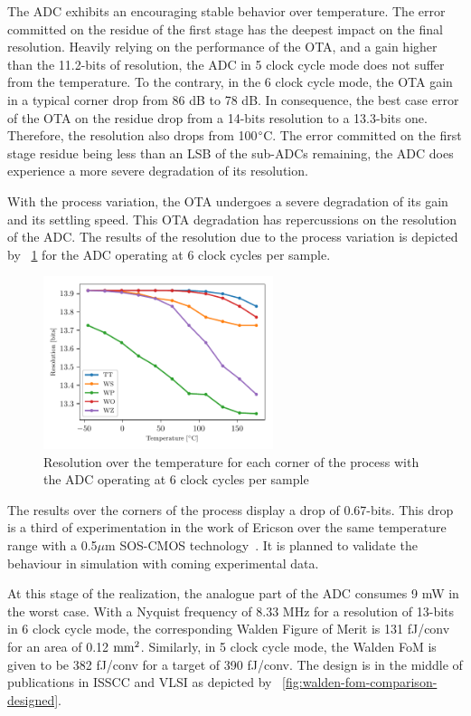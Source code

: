 The ADC exhibits an encouraging stable behavior over temperature. The error committed on the residue of the first stage has the deepest impact on the final resolution. Heavily relying on the performance of the OTA, and a gain higher than the 11.2-bits of resolution, the ADC in 5 clock cycle mode does not suffer from the temperature. To the contrary, in the 6 clock cycle mode, the OTA gain in a typical corner drop from 86 dB to 78 dB. In consequence, the best case error of the OTA on the residue drop from a 14-bits resolution to a 13.3-bits one. Therefore, the resolution also drops from 100$\degree$C. The error committed on the first stage residue being less than an LSB of the sub-ADCs remaining, the ADC does experience a more severe degradation of its resolution.

With the process variation, the OTA undergoes a severe degradation of its gain and its settling speed. This OTA degradation has repercussions on the resolution of the ADC. The results of the resolution due to the process variation is depicted by \figurename~\ref{fig:adc-res-schematic-temp-corners} for the ADC operating at 6 clock cycles per sample.

\begin{figure}[htp]
    \centering
    \includegraphics[width=0.6\textwidth]{Chapter5/Figs/preliminary/adc_real_ota_osr6_temp-corners.pdf}
    \caption{Resolution over the temperature for each corner of the process with the ADC operating at 6 clock cycles per sample}
    \label{fig:adc-res-schematic-temp-corners}
\end{figure}

The results over the corners of the process display a drop of 0.67-bits. This drop is a third of experimentation in the work of Ericson over the same temperature range with a 0.5$\mu$m SOS-CMOS technology~\cite{Ericson2004}. It is planned to validate the behaviour in simulation with coming experimental data.

At this stage of the realization, the analogue part of the ADC consumes 9 mW in the worst case. With a Nyquist frequency of 8.33 MHz for a resolution of 13-bits in 6 clock cycle mode, the corresponding Walden Figure of Merit is 131 fJ/conv for an area of 0.12 $\rm mm^2$. Similarly, in 5 clock cycle mode, the Walden FoM is given to be 382 fJ/conv for a target of 390 fJ/conv. The design is in the middle of publications in ISSCC and VLSI as depicted by \figurename~\ref{fig:walden-fom-comparison-designed}.


